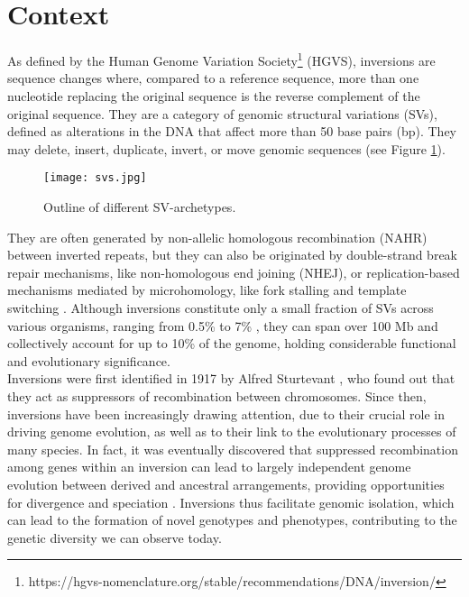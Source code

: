 \section{Context} 

As defined by the Human Genome Variation Society\footnote{https://hgvs-nomenclature.org/stable/recommendations/DNA/inversion/} (HGVS), inversions are sequence changes where, compared to a reference sequence, more than one nucleotide replacing the original sequence is the reverse complement of the original sequence. They are a category of genomic structural variations (SVs), defined as alterations in the DNA that affect more than 50 base pairs (bp). They may delete, insert, duplicate, invert, or move genomic sequences \cite{eslami_rasekh_discovery_2017} (see Figure \ref{fig:svs}). 

\begin{figure}[h]

  \centering
    \texttt{[image: svs.jpg]}

  \caption{Outline of different SV-archetypes.}
  \label{fig:svs}
\end{figure}

They are often generated by non-allelic homologous recombination (NAHR) between inverted repeats, but they can also be originated by double-strand break repair mechanisms, like non-homologous end joining (NHEJ), or replication-based mechanisms mediated by microhomology, like fork stalling and template switching \cite{puig_human_2015}. Although inversions constitute only a small fraction of SVs across various organisms, ranging from 0.5\% to 7\% \cite{hu_unravelling_2024}, they can span over 100 Mb and collectively account for up to 10\% of the genome, holding considerable functional and evolutionary significance. \\


Inversions were first identified in 1917 by Alfred Sturtevant \cite{sturtevant_case_1921}, who found out that they act as suppressors of recombination between chromosomes. Since then, inversions have been increasingly drawing attention, due to their crucial role in driving genome evolution, as well as to their link to the evolutionary processes of many species. In fact, it was eventually discovered that suppressed recombination among genes within an inversion can lead to largely independent genome evolution between derived and ancestral arrangements, providing opportunities for divergence and speciation \cite{faria_evolving_2019}. Inversions thus facilitate genomic isolation, which can lead to the formation of novel genotypes and phenotypes, contributing to the genetic diversity we can observe today. \\

